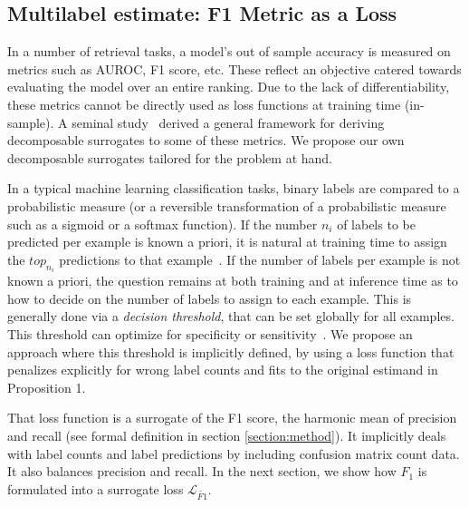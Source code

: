 \subsection{Multilabel estimate: F1 Metric as a Loss}
\label{section:background:metricsAsLosses}


In a number of retrieval tasks, a model's out of sample accuracy is measured on metrics such as AUROC, F1 score, etc. These reflect an objective catered towards evaluating the model over an entire ranking. Due to the lack of differentiability, these metrics cannot be directly used as loss functions at training time (in-sample). A seminal study~\cite{optimizableLosses} derived a general framework for deriving decomposable surrogates to some of these metrics. We propose our own decomposable surrogates tailored for the problem at hand.

In a typical machine learning classification tasks, binary labels are compared to a probabilistic measure (or a reversible
transformation of a probabilistic measure such as a sigmoid or a softmax
function). If the number $n_i$ of labels to be predicted per
example is known a priori, it is natural at training time to assign the $top_{n_i}$ predictions
to that example~\cite{lossTopKError, topKmulticlassSVM}. If the number of
labels per example is not known a priori, the question remains at both training and at inference time
as to how to decide on the number of labels to assign to each
example. This is generally done via a \emph{decision threshold}, that can be set globally for all
examples. This threshold can optimize for specificity or
sensitivity~\cite{decisionThreshold}. We propose an approach where this threshold is implicitly defined, by using a loss function that penalizes explicitly for wrong label counts and fits to the original estimand in Proposition 1.

That loss function is a surrogate of the F1 score, the harmonic mean of precision and recall (see formal definition in section \ref{section:method}). It implicitly deals with label counts and label predictions by including confusion matrix count data. It also balances precision and recall. In the next section, we show how $F_1$ is formulated into a surrogate loss $\mathcal{L}_{\widetilde{\mathit{F1}}}$.




